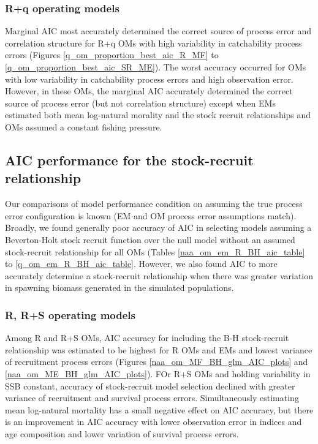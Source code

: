 \documentclass[
  12pt,
]{article}
\begin{document}
\hypertarget{rq-operating-models-1}{%
\subsubsection*{R+q operating models}\label{rq-operating-models-1}}

Marginal AIC most accurately determined the correct source of process
error and correlation structure for R+q OMs with high variability in
catchability process errors (Figures \ref{q_om_proportion_best_aic_R_MF}
to \ref{q_om_proportion_best_aic_SR_ME}). The worst accuracy occurred
for OMs with low variability in catchability process errors and high
observation error. However, in these OMs, the marginal AIC accurately
determined the correct source of process error (but not correlation
structure) except when EMs estimated both mean log-natural morality and
the stock recruit relationships and OMs assumed a constant fishing
pressure.

\hypertarget{aic-performance-for-the-stock-recruit-relationship}{%
\subsection*{AIC performance for the stock-recruit
relationship}\label{aic-performance-for-the-stock-recruit-relationship}}

Our comparisons of model performance condition on assuming the true
process error configuration is known (EM and OM process error
assumptions match). Broadly, we found generally poor accuracy of AIC in
selecting models assuming a Beverton-Holt stock recruit function over
the null model without an assumed stock-recruit relationship for all OMs
(Tables \ref{naa_om_em_R_BH_aic_table} to \ref{q_om_em_R_BH_aic_table}.
However, we also found AIC to more accurately determine a stock-recruit
relationship when there was greater variation in spawning biomass
generated in the simulated populations.

\hypertarget{r-rs-operating-models-2}{%
\subsubsection*{R, R+S operating models}\label{r-rs-operating-models-2}}

Among R and R+S OMs, AIC accuracy for including the B-H stock-recruit
relationship was estimated to be highest for R OMs and EMs and lowest
variance of recruitment process errors (Figures
\ref{naa_om_MF_BH_glm_AIC_plots} and \ref{naa_om_ME_BH_glm_AIC_plots}).
FOr R+S OMs and holding variability in SSB constant, accuracy of
stock-recruit model selection declined with greater variance of
recruitment and survival process errors. Simultaneously estimating mean
log-natural mortality has a small negative effect on AIC accuracy, but
there is an improvement in AIC accuracy with lower observation error in
indices and age composition and lower variation of survival process
errors.
\end{document}
